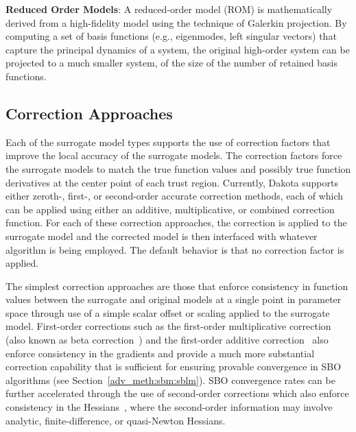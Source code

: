 \textbf{Reduced Order Models}: A reduced-order model (ROM) is
mathematically derived from a high-fidelity model using the technique
of Galerkin projection.  By computing a set of basis functions (e.g.,
eigenmodes, left singular vectors) that capture the principal dynamics
of a system, the original high-order system can be projected to a much
smaller system, of the size of the number of retained basis functions.

\subsection{Correction Approaches}

Each of the surrogate model types supports the use of correction
factors that improve the local accuracy of the surrogate models. The
correction factors force the surrogate models to match the true
function values and possibly true function derivatives at the center
point of each trust region. Currently, Dakota supports either zeroth-,
first-, or second-order accurate correction methods, each of which can
be applied using either an additive, multiplicative, or combined
correction function. For each of these correction approaches, the
correction is applied to the surrogate model and the corrected model
is then interfaced with whatever algorithm is being employed.  The
default behavior is that no correction factor is applied.

The simplest correction approaches are those that enforce consistency
in function values between the surrogate and original models at a
single point in parameter space through use of a simple scalar offset
or scaling applied to the surrogate model.  First-order corrections
such as the first-order multiplicative correction (also known as beta
correction~\cite{Cha93}) and the first-order additive
correction~\cite{Lew00} also enforce consistency in the gradients and
provide a much more substantial correction capability that is
sufficient for ensuring provable convergence in SBO algorithms (see
Section~\ref{adv_meth:sbm:sblm}).  SBO convergence rates can be further
accelerated through the use of second-order corrections which also
enforce consistency in the Hessians~\cite{Eld04}, where the
second-order information may involve analytic, finite-difference, or
quasi-Newton Hessians.

